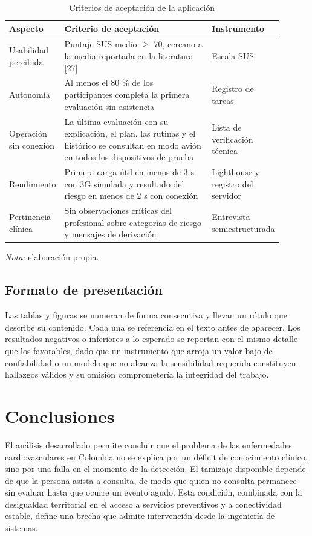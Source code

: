 \documentclass[conference]{IEEEtran}
\begin{document}
\begin{table}[!t]
\centering
\caption{Criterios de aceptación de la aplicación}
\footnotesize
\renewcommand{\arraystretch}{1.15}
\begin{tabular}{>{\raggedright\arraybackslash}p{0.110\linewidth}>{\raggedright\arraybackslash}p{0.641\linewidth}>{\raggedright\arraybackslash}p{0.151\linewidth}}
\hline
\textbf{Aspecto} & \textbf{Criterio de aceptación} & \textbf{Instrumento} \\ \hline
Usabilidad percibida & Puntaje SUS medio $\geq$ 70, cercano a la media reportada en la literatura [27] & Escala SUS \\ \hline
Autonomía & Al menos el 80 \% de los participantes completa la primera evaluación sin asistencia & Registro de tareas \\ \hline
Operación sin conexión & La última evaluación con su explicación, el plan, las rutinas y el histórico se consultan en modo avión en todos los dispositivos de prueba & Lista de verificación técnica \\ \hline
Rendimiento & Primera carga útil en menos de 3 s con 3G simulada y resultado del riesgo en menos de 2 s con conexión & Lighthouse y registro del servidor \\ \hline
Pertinencia clínica & Sin observaciones críticas del profesional sobre categorías de riesgo y mensajes de derivación & Entrevista semiestructurada \\ \hline
\end{tabular}
\par\smallskip\parbox{\linewidth}{\scriptsize\textit{Nota:} elaboración propia.}
\end{table}
\subsection{Formato de presentación}
Las tablas y figuras se numeran de forma consecutiva y llevan un rótulo que describe su contenido. Cada una se referencia en el texto antes de aparecer. Los resultados negativos o inferiores a lo esperado se reportan con el mismo detalle que los favorables, dado que un instrumento que arroja un valor bajo de confiabilidad o un modelo que no alcanza la sensibilidad requerida constituyen hallazgos válidos y su omisión comprometería la integridad del trabajo.

\section{Conclusiones}
El análisis desarrollado permite concluir que el problema de las enfermedades cardiovasculares en Colombia no se explica por un déficit de conocimiento clínico, sino por una falla en el momento de la detección. El tamizaje disponible depende de que la persona asista a consulta, de modo que quien no consulta permanece sin evaluar hasta que ocurre un evento agudo. Esta condición, combinada con la desigualdad territorial en el acceso a servicios preventivos y a conectividad estable, define una brecha que admite intervención desde la ingeniería de sistemas.
\end{document}
